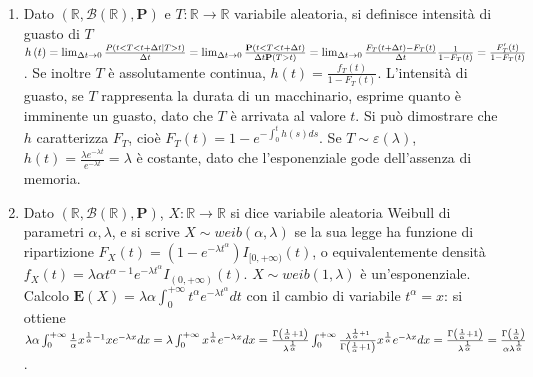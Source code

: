 \documentclass{article}
\begin{document}
\begin{enumerate}
\item Dato $\left( 
\mathbb{R}
,\mathcal{B}\left( 
\mathbb{R}
\right) ,\mathbf{P}\right) $ e $T:%
\mathbb{R}
\rightarrow 
\mathbb{R}
$ variabile aleatoria, si definisce intensit\`{a} di guasto di $T$ $h\left(
t\right) =\lim_{\Delta t\rightarrow 0}\frac{P\left( t<T<t+\Delta
t|T>t\right) }{\Delta t}=\lim_{\Delta t\rightarrow 0}\frac{\mathbf{P}\left(
t<T<t+\Delta t\right) }{\Delta t\mathbf{P}\left( T>t\right) }=\lim_{\Delta
t\rightarrow 0}\frac{F_{T}\left( t+\Delta t\right) -F_{T}\left( t\right) }{%
\Delta t}\frac{1}{1-F_{T}\left( t\right) }=\frac{F_{T}^{\prime }\left(
t\right) }{1-F_{T}\left( t\right) }$. Se inoltre $T$ \`{e} assolutamente
continua, $h\left( t\right) =\frac{f_{T}\left( t\right) }{1-F_{T}\left(
t\right) }$. L'intensit\`{a} di guasto, se $T$ rappresenta la durata di un
macchinario, esprime quanto \`{e} imminente un guasto, dato che $T$ \`{e}
arrivata al valore $t$. Si pu\`{o} dimostrare che $h$ caratterizza $F_{T}$,
cio\`{e} $F_{T}\left( t\right) =1-e^{-\int_{0}^{t}h\left( s\right) ds}$. Se $%
T\sim \varepsilon \left( \lambda \right) $, $h\left( t\right) =\frac{\lambda
e^{-\lambda t}}{e^{-\lambda t}}=\lambda $ \`{e} costante, dato che
l'esponenziale gode dell'assenza di memoria.

\item Dato $\left( 
\mathbb{R}
,\mathcal{B}\left( 
\mathbb{R}
\right) ,\mathbf{P}\right) $, $X:%
\mathbb{R}
\rightarrow 
\mathbb{R}
$ si dice variabile aleatoria Weibull di parametri $\alpha ,\lambda $, e si
scrive $X\sim weib\left( \alpha ,\lambda \right) $ se la sua legge ha
funzione di ripartizione $F_{X}\left( t\right) =\left( 1-e^{-\lambda
t^{\alpha }}\right) I_{[0,+\infty )}\left( t\right) $, o equivalentemente
densit\`{a} $f_{X}\left( t\right) =\lambda \alpha t^{\alpha -1}e^{-\lambda
t^{\alpha }}I_{\left( 0,+\infty \right) }\left( t\right) $. $X\sim
weib\left( 1,\lambda \right) $ \`{e} un'esponenziale. Calcolo $\mathbf{E}%
\left( X\right) =\lambda \alpha \int_{0}^{+\infty }t^{\alpha }e^{-\lambda
t^{\alpha }}dt$ con il cambio di variabile $t^{\alpha }=x$: si ottiene $%
\lambda \alpha \int_{0}^{+\infty }\frac{1}{\alpha }x^{\frac{1}{\alpha }%
-1}xe^{-\lambda x}dx=\lambda \int_{0}^{+\infty }x^{\frac{1}{\alpha }%
}e^{-\lambda x}dx=\frac{\Gamma \left( \frac{1}{\alpha }+1\right) }{\lambda ^{%
\frac{1}{\alpha }}}\int_{0}^{+\infty }\frac{\lambda ^{\frac{1}{\alpha }+1}}{%
\Gamma \left( \frac{1}{\alpha }+1\right) }x^{\frac{1}{\alpha }}e^{-\lambda
x}dx=\frac{\Gamma \left( \frac{1}{\alpha }+1\right) }{\lambda ^{\frac{1}{%
\alpha }}}=\frac{\Gamma \left( \frac{1}{\alpha }\right) }{\alpha \lambda ^{%
\frac{1}{\alpha }}}$.


\end{enumerate}
\end{document}
